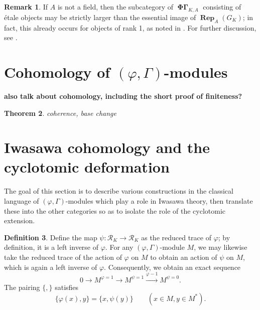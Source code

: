 \documentclass[12pt]{amsart}
\newtheorem{theorem}{Theorem}[section]
\theoremstyle{definition}
\newtheorem{defn}[theorem]{Definition}
\newtheorem{remark}[theorem]{Remark}
\numberwithin{equation}{theorem}
\newcommand{\calR}{\mathcal{R}}
\DeclareMathOperator{\PhiGamma}{\mathbf{\Phi \Gamma}}
\DeclareMathOperator{\Rep}{\mathbf{Rep}}
\begin{document}
\begin{remark}
If $A$ is not a field, then the subcategory of $\PhiGamma_{K,A}$ consisting of \'etale objects may be strictly larger than the essential image of $\Rep_A(G_K)$; in fact, this already occurs for objects of rank 1, as noted in \cite[Remarque 4.2.10]{berger-colmez}.
For further discussion, see \cite{kedlaya-liu-families}.
\end{remark}

\section{Cohomology of $(\varphi, \Gamma)$-modules}

\textbf{also talk about cohomology, including the short proof of finiteness?}

\begin{theorem}
coherence, base change
\end{theorem}

\section{Iwasawa cohomology and the cyclotomic deformation}

The goal of this section is to describe various constructions in the classical language of $(\varphi, \Gamma)$-modules which play a role in Iwasawa theory, then translate these into the other categories so as to isolate the role of the cyclotomic extension.

\begin{defn}
Define the map $\psi: \calR_K \to \calR_K$ as the reduced trace of $\varphi$; by definition, it is a left inverse of $\varphi$. For any $(\varphi, \Gamma)$-module $M$,
we may likewise take the reduced trace of the action of $\varphi$ on $M$ to obtain an action of $\psi$ on $M$, which is again a left inverse of $\varphi$. Consequently, we obtain an exact sequence
\begin{equation} \label{eq:psi sequence}
0 \to M^{\varphi=1} \to M^{\psi=1} \stackrel{\varphi-1}{\longrightarrow} M^{\psi=0}.
\end{equation}
The pairing $\{, \}$ satisfies
\begin{equation} \label{eq:pairing phi psi}
\{\varphi(x), y\} = \{x, \psi(y)\} \qquad (x \in M, y \in M^*).
\end{equation}
\end{defn}
\end{document}
